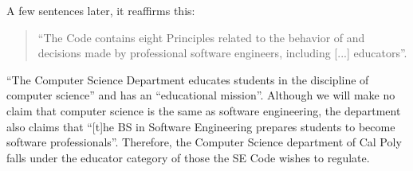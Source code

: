 \documentclass[11pt]{article}
\begin{document}
\begin{multicols}{2}
A few sentences later, it reaffirms this:

\begin{quote}
``The Code contains eight Principles related to the behavior of and decisions made by professional software engineers, including [...] educators''. \cite{secode}
\end{quote}


``The Computer Science Department educates students in the discipline of computer science'' and has an ``educational mission''. \cite{catalogDept}  Although we will make no claim that computer science is the same as software engineering, the department also claims that ``[t]he BS in Software Engineering prepares students to become software professionals''. \cite{catalogDept}  Therefore, the Computer Science department of Cal Poly falls under the educator category of those the SE Code wishes to regulate.



\end{multicols}
\end{document}
